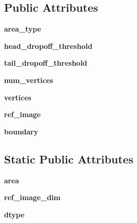 \subsection*{Public Attributes}
\begin{DoxyCompactItemize}
\item 
\mbox{\label{class_polygon_1_1_polygon_ac9691d93cf33afeffe3b6189bc953b8f}} 
{\bfseries area\+\_\+type}
\item 
\mbox{\label{class_polygon_1_1_polygon_a93f8a4762b35edde480c6dba39a096c7}} 
{\bfseries head\+\_\+dropoff\+\_\+threshold}
\item 
\mbox{\label{class_polygon_1_1_polygon_a01e5d3db8058b94da8b8ce684be4addc}} 
{\bfseries tail\+\_\+dropoff\+\_\+threshold}
\item 
\mbox{\label{class_polygon_1_1_polygon_afc982f2b14f86c9407c328e9fcaade50}} 
{\bfseries num\+\_\+vertices}
\item 
\mbox{\label{class_polygon_1_1_polygon_a40724157e421d308e93b346768313758}} 
{\bfseries vertices}
\item 
\mbox{\label{class_polygon_1_1_polygon_a70a4081b1aa16c15dcb63a2228d2ee14}} 
{\bfseries ref\+\_\+image}
\item 
\mbox{\label{class_polygon_1_1_polygon_ad047be44ee99d47710212237372b87dc}} 
{\bfseries boundary}
\end{DoxyCompactItemize}
\subsection*{Static Public Attributes}
\begin{DoxyCompactItemize}
\item 
\mbox{\label{class_polygon_1_1_polygon_a499b1bec5dd4df1e635ac343421b28ea}} 
{\bfseries area}
\item 
\mbox{\label{class_polygon_1_1_polygon_a336ae2118074be5b46f1a83197142722}} 
{\bfseries ref\+\_\+image\+\_\+dim}
\item 
\mbox{\label{class_polygon_1_1_polygon_ae776b3292cf36171315924e63f5903e7}} 
{\bfseries dtype}
\end{DoxyCompactItemize}


